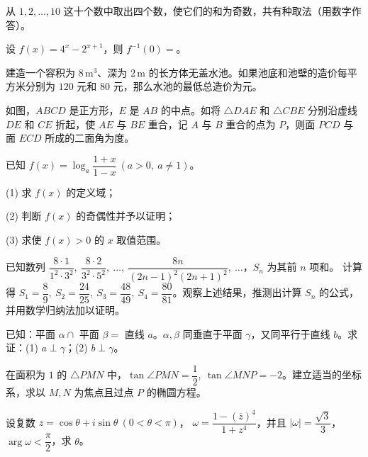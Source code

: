 \begin{question}
从 $1,2,\ldots,10$ 这十个数中取出四个数，使它们的和为奇数，共有\underline{\qquad\qquad}种取法（用数字作答）。

\end{question}
\begin{question}
设 $f(x)=4^x-2^{x+1}$，则 $f^{-1}(0)=$\underline{\qquad\qquad}。

\end{question}
\begin{question}
建造一个容积为 $8\,\mathrm{m}^3$、深为 $2\,\mathrm m$ 的长方体无盖水池。如果池底和池壁的造价每平方米分别为 $120$ 元和 $80$ 元，那么水池的最低总造价为\underline{\qquad\qquad}元。

\Needspace{0.4\textheight}
\end{question}
\begin{question}
如图，$ABCD$ 是正方形，$E$ 是 $AB$ 的中点。如将 $\triangle DAE$ 和 $\triangle CBE$ 分别沿虚线 $DE$ 和 $CE$ 折起，使 $AE$ 与 $BE$ 重合，记 $A$ 与 $B$ 重合的点为 $P$，则面 $PCD$ 与面 $ECD$ 所成的二面角为\underline{\qquad\qquad}度。
\nopagebreak[4]
\begin{center}\end{center}
\nopagebreak[4]
\end{question}
\begin{question}
已知 $f(x)=\log_a\dfrac{1+x}{1-x}\ (a>0,\ a\ne1)$。

(1) 求 $f(x)$ 的定义域；

(2) 判断 $f(x)$ 的奇偶性并予以证明；

(3) 求使 $f(x)>0$ 的 $x$ 取值范围。

\end{question}
\begin{question}
已知数列
$\dfrac{8\cdot1}{1^2\cdot3^2},\ \dfrac{8\cdot2}{3^2\cdot5^2},\ \ldots,\ \dfrac{8n}{(2n-1)^2(2n+1)^2},\ \ldots$，$S_n$ 为其前 $n$ 项和。
计算得 $S_1=\dfrac89,\ S_2=\dfrac{24}{25},\ S_3=\dfrac{48}{49},\ S_4=\dfrac{80}{81}$。观察上述结果，推测出计算 $S_n$ 的公式，并用数学归纳法加以证明。

\end{question}
\begin{question}
已知：平面 $\alpha\cap$ 平面 $\beta=$ 直线 $a$。$\alpha,\beta$ 同垂直于平面 $\gamma$，又同平行于直线 $b$。求证：(1) $a\perp\gamma$；(2) $b\perp\gamma$。

\end{question}
\begin{question}
在面积为 $1$ 的 $\triangle PMN$ 中，$\tan\angle PMN=\dfrac12,\ \tan\angle MNP=-2$。建立适当的坐标系，求以 $M,N$ 为焦点且过点 $P$ 的椭圆方程。

\end{question}
\begin{question}
 设复数 $z=\cos\theta+i\sin\theta\ (0<\theta<\pi)$，
$\omega=\dfrac{1-(\overline z)^4}{1+z^4}$，并且 $|\omega|=\dfrac{\sqrt3}{3}$，$\arg\omega<\dfrac\pi2$，求 $\theta$。

\end{question}
